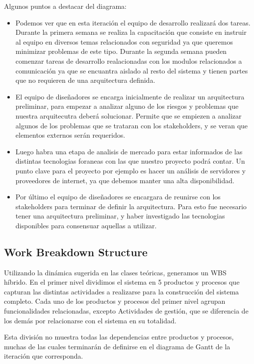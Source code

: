Algunos puntos a destacar del diagrama:
\begin{itemize}
 \item Podemos ver que en esta iteración el equipo de desarrollo realizará dos tareas. Durante la primera semana se realiza la capacitación que consiste en instruir al equipo en diversos temas relacionados con seguridad ya que queremos minimizar problemas de este tipo. Durante la segunda semana pueden comenzar tareas de desarrollo realacionadas con los modulos relacionados a comunicación ya que se encuantra aislado al resto del sistema y tienen partes que no requieren de una arquitectura definida.
 \item El equipo de diseñadores se encarga inicialmente de realizar un arquitectura preliminar, para empezar a analizar alguno de los riesgos y problemas que nuestra arquitecutra deberá solucionar. Permite que se empiezen a analizar algunos de los problemas que se trataran con los stakeholders, y se veran que elementos externos serán requeridos.
 \item Luego habra una etapa de analisis de mercado para estar informados de las distintas tecnologias foraneas con las que nuestro proyecto podr\'a contar. Un punto clave para el proyecto por ejemplo es hacer un an\'alisis de servidores y proveedores de internet, ya que debemos manter una alta disponibilidad.
 \item Por último el equipo de diseñadores se encargara de reunirse con los stakeholders para terminar de definir la arquitectura. Para esto fue necesario tener una arquitectura preliminar, y haber investigado las tecnologias disponibles para consensuar aquellas a utilizar. 
\end{itemize}
\renewcommand{\labelitemi}{}


\subsection{Work Breakdown Structure} 

Utilizando la dinámica sugerida en las clases teóricas, generamos un WBS híbrido. En el primer nivel dividimos el sistema en 5 productos y procesos que capturan las distintas actividades a realizarse para la construcción del sistema completo. Cada uno de los productos y procesos del primer nivel agrupan funcionalidades relacionadas, excepto Actividades de gestión, que se diferencia de los demás por relacionarse con el sistema en su totalidad.

Esta división no muestra todas las dependencias entre productos y procesos, muchas de las cuales terminarán de definirse en el diagrama de Gantt de la iteración que corresponda.

